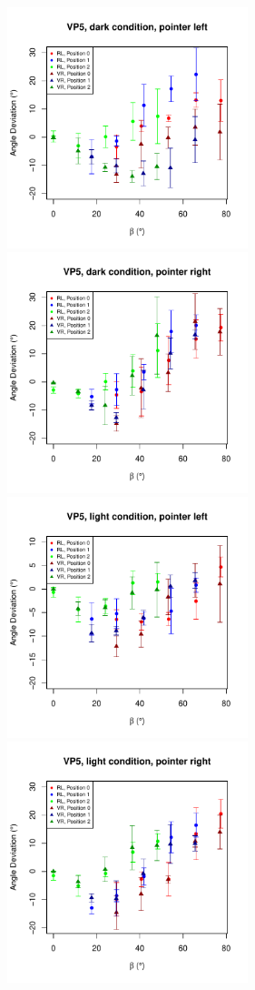 \begin{figure}
    \includegraphics[width = 7cm]{Images/plots/AngleDevVP5BOTHDarkLeft.pdf}
    \includegraphics[width = 7cm]{Images/plots/AngleDevVP5BOTHDarkRight.pdf}
    \includegraphics[width = 7cm]{Images/plots/AngleDevVP5BOTHLightLeft.pdf}
    \includegraphics[width = 7cm]{Images/plots/AngleDevVP5BOTHLightRight.pdf}

\end{figure}
